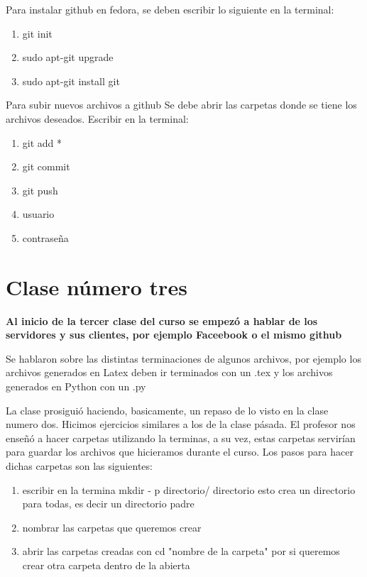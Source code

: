 \documentclass{book}
\begin{document}
\begin{enumerate}
\begin{enumerate}
	\end{enumerate}
	Para instalar github en fedora, se deben escribir lo siguiente en la terminal: 
	\begin{enumerate}
		\item git init
		\item sudo apt-git upgrade
		\item sudo apt-git install git
	\end{enumerate}
	
	
	Para subir nuevos archivos a github
	Se debe abrir las carpetas donde se tiene los archivos deseados. 
	Escribir en la terminal:
	\begin{enumerate}
		\item git add *
		\item git commit
		\item git push
		\item usuario
		\item contraseña
	\end{enumerate}


\chapter{Clase número tres}
\textbf{Al inicio de la tercer clase del curso se empezó a hablar de los servidores y sus clientes, por ejemplo Faceebook o el mismo github}

Se hablaron sobre las distintas terminaciones de algunos archivos, por ejemplo los archivos generados en Latex deben ir terminados con un .tex y los archivos generados en Python con un .py

La clase prosiguió haciendo, basicamente, un repaso de lo visto en la clase numero dos. Hicimos ejercicios similares a los de la clase pásada. 
El profesor nos enseñó a hacer carpetas utilizando la terminas, a su vez, estas carpetas servirían para guardar los archivos que hicieramos durante el curso. Los pasos para hacer dichas carpetas son las siguientes:
\begin{enumerate}
	\item escribir en la termina mkdir - p directorio/ directorio esto crea un directorio para todas, es decir un directorio padre
	\item nombrar las carpetas que queremos crear 
	\item abrir las carpetas creadas con cd "nombre de la carpeta" por si queremos crear otra carpeta dentro de la abierta
	
	
\end{enumerate}


\end{enumerate}
\end{document}
